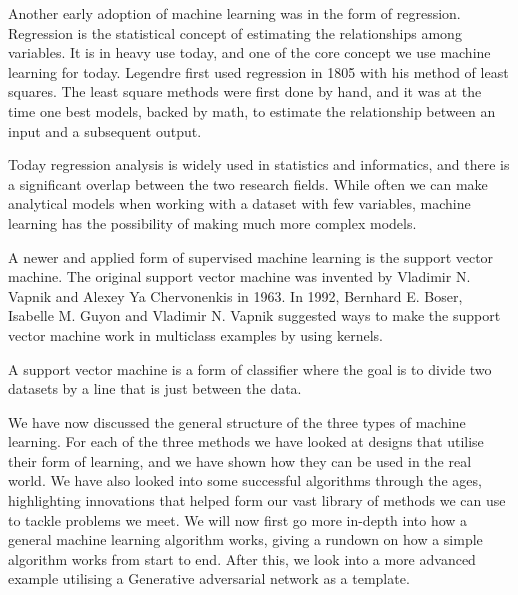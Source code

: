 \vspace{5px}

Another early adoption of machine learning was in the form of regression. Regression is the statistical concept of estimating the relationships among variables. It is in heavy use today, and one of the core concept we use machine learning for today. 
Legendre first used regression in 1805 with his method of least squares. The least square methods were first done by hand, and it was at the time one best models, backed by math, to estimate the relationship between an input and a subsequent output. 

Today regression analysis is widely used in statistics and informatics, and there is a significant overlap between the two research fields. While often we can make analytical models when working with a dataset with few variables, machine learning has the possibility of making much more complex models.

\vspace{5px}

A newer and applied form of supervised machine learning is the support vector machine. The original support vector machine was invented by Vladimir N. Vapnik and Alexey Ya Chervonenkis in 1963.  
In 1992, Bernhard E. Boser, Isabelle M. Guyon and Vladimir N. Vapnik suggested ways to make the support vector machine work in multiclass examples by using kernels.  

A support vector machine is a form of classifier where the goal is to divide two datasets by a line that is just between the data. 


\vspace{5px} 


    
We have now discussed the general structure of the three types of machine learning. For each of the three methods we have looked at designs that utilise their form of learning, and we have shown how they can be used in the real world.
We have also looked into some successful algorithms through the ages, highlighting innovations that helped form our vast library of methods we can use to tackle problems we meet.
We will now first go more in-depth into how a general machine learning algorithm works, giving a rundown on how a simple algorithm works from start to end.
After this, we look into a more advanced example utilising a Generative adversarial network as a template.



